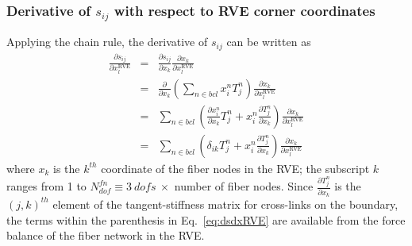 \documentclass[12pt,aps,pre]{revtex4}
\begin{document}
\subsubsection{Derivative of $s_{ij}$ with respect to RVE corner coordinates}
%
Applying the chain rule, the derivative of $s_{ij}$ can be written as
%
\begin{eqnarray}
\frac{\partial s_{ij}}{\partial x_l^{\text{RVE}}} &=& \frac{\partial s_{ij}}{\partial x_k}\frac{\partial x_k}{\partial x_l^{\text{RVE}}} \nonumber\\ 
%
&=& \frac{\partial}{\partial x_k} \left(\sum_{n \in bcl} x_i^{n} T_j^n \right) \frac{\partial x_k}{\partial x_l^{\text{RVE}}} \nonumber\\
%
&=&\sum_{n \in bcl} \left( \frac{\partial x_i^{n}}{\partial x_k} T_j^n + x_i^n \frac{\partial T_j^n}{\partial x_k}  \right) \frac{\partial x_k}{\partial x_l^{\text{RVE}}} \nonumber\\
%
&=&\sum_{n \in bcl} \left( \delta_{ik} T_j^n + x_i^n \frac{\partial T_j^n}{\partial x_k}  \right) \frac{\partial x_k}{\partial x_l^{\text{RVE}}}
\label{eq:dsdxRVE}
\end{eqnarray}
%
where $x_k$ is the $k^{th}$ coordinate of the fiber nodes in the RVE; the subscript $k$ ranges from 1 to $N_{dof}^{fn} \equiv 3 \ dofs \ \times$ number of fiber nodes. Since $\frac{\partial T_j^n}{\partial x_k}$ is the $(j,k)^{th}$ element of the tangent-stiffness matrix for cross-links on the boundary, the terms within the parenthesis in Eq.\ \eqref{eq:dsdxRVE} are available from the force balance of the fiber network in the RVE. 
\end{document}
